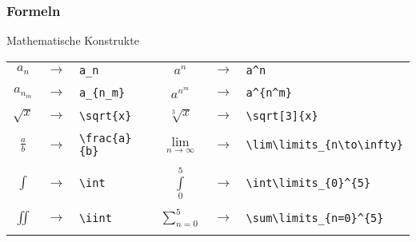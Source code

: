 \begin{frame}[fragile]
    \frametitle{Formeln}
    \begin{block}{Mathematische Konstrukte}
        \begin{tabular}{c@{}c@{}l @{$\quad$} 
                        c@{}c@{}l}
            $a_n$                       & $\to$ & \verb!a_n!                        &
            $a^n$                       & $\to$ & \verb!a^n!                        \\\\
            \pause
            $a_{n_m}$                   & $\to$ & \verb!a_{n_m}!                    &
            $a^{n^m}$                   & $\to$ & \verb!a^{n^m}!                    \\\\
            \pause
            $\sqrt{x}$                  & $\to$ & \verb!\sqrt{x}!                   &
            $\sqrt[3]{x}$               & $\to$ & \verb!\sqrt[3]{x}!                \\\\
            \pause
            $\frac{a}{b}$               & $\to$ & \verb!\frac{a}{b}!                &
            \pause
            $\lim\limits_{n\to\infty}$  & $\to$ & \verb!\lim\limits_{n\to\infty}!   \\\\
            \pause
            $\int$                      & $\to$ & \verb!\int!                       &
            \pause
            $\int\limits_{0}^{5}$       & $\to$ & \verb!\int\limits_{0}^{5}!        \\\\
            \pause
            $\iint$                     & $\to$ & \verb!\iint!                      &
            \pause
            $\sum\limits_{n=0}^{5}$     & $\to$ & \verb!\sum\limits_{n=0}^{5}!      \\\\
        \end{tabular}
    \end{block}
\end{frame}
